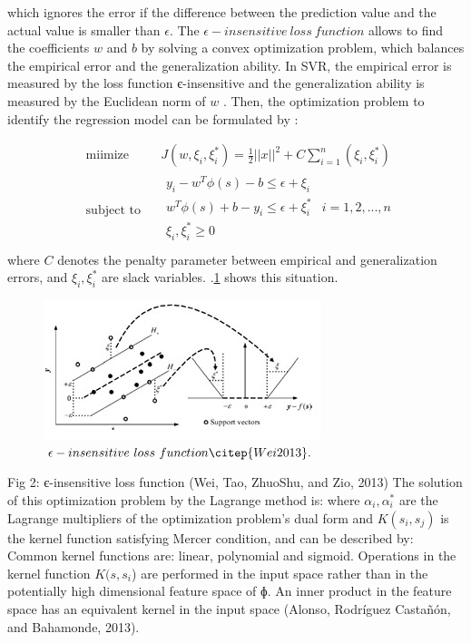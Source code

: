 \documentclass[review]{elsarticle}
\begin{document}
which ignores the error if the difference between the prediction value and the actual value is smaller than $ \epsilon$.
The $ \epsilon -insensitive \ loss \ function$ allows to find the coefficients $w$ and $b$ by solving a convex optimization problem, which balances the empirical error and the generalization ability. In SVR, the empirical error is measured by the loss function є-insensitive and the generalization ability is measured by the Euclidean norm of $w$ \citep{XXXX201X}. Then, the optimization problem to identify the regression model can be formulated by \citep{Wei2013}:


\begin{equation} 
\begin{aligned}
& \underset{}{\text{miimize}}
& & J(w,\xi_i , \xi_i^* ) = \frac{1}{2}   \Bigr| \Bigr| x \Bigr| \Bigr|^2 + C \sum_{i=1}^{n} (\xi_i , \xi_i^* )    \\
& \text{subject to}
& & \begin{array}{lcl} 
y_i - w^T \phi (s) - b  \leq \epsilon + \xi_i   \\
w^T \phi (s) + b - y_i \leq \epsilon + \xi_i^* & i= 1,2,...,n \\
\xi_i , \xi_i^* \geq 0  \\
\end{array}
\end{aligned}
\end{equation}  
where $C$ denotes the penalty parameter between empirical and generalization errors, and  $\xi_i , \xi_i^*$ are slack variables. \figurename
$.$\ref{figura2} shows this situation.

\begin{figure}[h] 
 \centering
 \includegraphics[scale=.9]{SVR}
 \caption{$\epsilon -insensitive \ loss \ function \citep{Wei2013}.$} 
 \label{figura2} 
\end{figure}
 
Fig 2: є-insensitive loss function (Wei, Tao, ZhuoShu, and Zio, 2013)
The solution of this optimization problem by the Lagrange method is:
where $α_i,α_i^*$  are the Lagrange multipliers of the optimization problem’s dual form and $K(s_i,s_j )$ is the kernel function satisfying Mercer condition, and can be described by:
Common kernel functions are: linear, polynomial and sigmoid.
Operations in the kernel function $K(s,s_i $) are performed in the input space rather than in the potentially high dimensional feature space of $ɸ$. An inner product in the feature space has an equivalent kernel in the input space (Alonso, Rodríguez Castañón, and Bahamonde, 2013).
\end{document}

